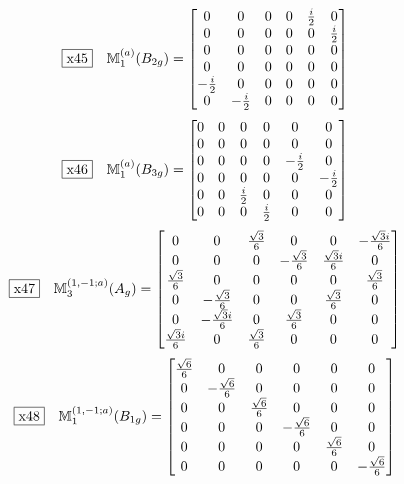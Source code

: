 \documentclass[fleqn,10pt,landscape]{jsarticle}
\begin{document}
\begin{dmath*}
\fbox{x45}\quad \mathbb{M}_{1}^{(a)}(B_{2g})=\begin{bmatrix} 0 & 0 & 0 & 0 & \frac{i}{2} & 0 \\ 0 & 0 & 0 & 0 & 0 & \frac{i}{2} \\ 0 & 0 & 0 & 0 & 0 & 0 \\ 0 & 0 & 0 & 0 & 0 & 0 \\ - \frac{i}{2} & 0 & 0 & 0 & 0 & 0 \\ 0 & - \frac{i}{2} & 0 & 0 & 0 & 0 \end{bmatrix}
\end{dmath*}
\begin{dmath*}
\fbox{x46}\quad \mathbb{M}_{1}^{(a)}(B_{3g})=\begin{bmatrix} 0 & 0 & 0 & 0 & 0 & 0 \\ 0 & 0 & 0 & 0 & 0 & 0 \\ 0 & 0 & 0 & 0 & - \frac{i}{2} & 0 \\ 0 & 0 & 0 & 0 & 0 & - \frac{i}{2} \\ 0 & 0 & \frac{i}{2} & 0 & 0 & 0 \\ 0 & 0 & 0 & \frac{i}{2} & 0 & 0 \end{bmatrix}
\end{dmath*}
\begin{dmath*}
\fbox{x47}\quad \mathbb{M}_{3}^{(1,-1;a)}(A_{g})=\begin{bmatrix} 0 & 0 & \frac{\sqrt{3}}{6} & 0 & 0 & - \frac{\sqrt{3} i}{6} \\ 0 & 0 & 0 & - \frac{\sqrt{3}}{6} & \frac{\sqrt{3} i}{6} & 0 \\ \frac{\sqrt{3}}{6} & 0 & 0 & 0 & 0 & \frac{\sqrt{3}}{6} \\ 0 & - \frac{\sqrt{3}}{6} & 0 & 0 & \frac{\sqrt{3}}{6} & 0 \\ 0 & - \frac{\sqrt{3} i}{6} & 0 & \frac{\sqrt{3}}{6} & 0 & 0 \\ \frac{\sqrt{3} i}{6} & 0 & \frac{\sqrt{3}}{6} & 0 & 0 & 0 \end{bmatrix}
\end{dmath*}
\begin{dmath*}
\fbox{x48}\quad \mathbb{M}_{1}^{(1,-1;a)}(B_{1g})=\begin{bmatrix} \frac{\sqrt{6}}{6} & 0 & 0 & 0 & 0 & 0 \\ 0 & - \frac{\sqrt{6}}{6} & 0 & 0 & 0 & 0 \\ 0 & 0 & \frac{\sqrt{6}}{6} & 0 & 0 & 0 \\ 0 & 0 & 0 & - \frac{\sqrt{6}}{6} & 0 & 0 \\ 0 & 0 & 0 & 0 & \frac{\sqrt{6}}{6} & 0 \\ 0 & 0 & 0 & 0 & 0 & - \frac{\sqrt{6}}{6} \end{bmatrix}
\end{dmath*}
\end{document}
